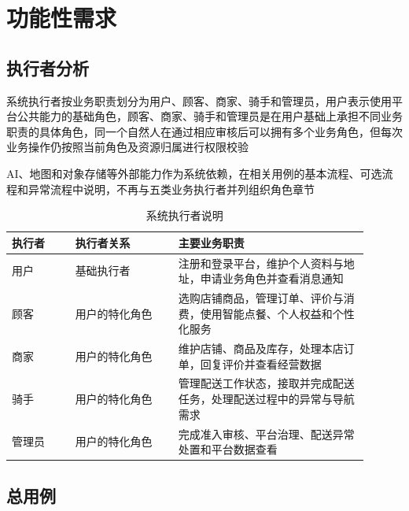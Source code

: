 \section{功能性需求}

\subsection{执行者分析}

系统执行者按业务职责划分为用户、顾客、商家、骑手和管理员，用户表示使用平台公共能力的基础角色，顾客、商家、骑手和管理员是在用户基础上承担不同业务职责的具体角色，同一个自然人在通过相应审核后可以拥有多个业务角色，但每次业务操作仍按照当前角色及资源归属进行权限校验

AI、地图和对象存储等外部能力作为系统依赖，在相关用例的基本流程、可选流程和异常流程中说明，不再与五类业务执行者并列组织角色章节

\begin{longtable}{|L{0.16\linewidth}|L{0.26\linewidth}|L{0.48\linewidth}|}
\caption{系统执行者说明}\label{tab:actors}\\ \hline
\textbf{执行者} & \textbf{执行者关系} & \textbf{主要业务职责} \\ \hline
用户 & 基础执行者 & 注册和登录平台，维护个人资料与地址，申请业务角色并查看消息通知 \\ \hline
顾客 & 用户的特化角色 & 选购店铺商品，管理订单、评价与消费，使用智能点餐、个人权益和个性化服务 \\ \hline
商家 & 用户的特化角色 & 维护店铺、商品及库存，处理本店订单，回复评价并查看经营数据 \\ \hline
骑手 & 用户的特化角色 & 管理配送工作状态，接取并完成配送任务，处理配送过程中的异常与导航需求 \\ \hline
管理员 & 用户的特化角色 & 完成准入审核、平台治理、配送异常处置和平台数据查看 \\ \hline
\end{longtable}

\subsection{总用例}

